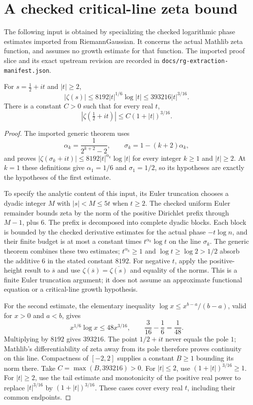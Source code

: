 \section{A checked critical-line zeta bound}

The following input is obtained by specializing the checked logarithmic
phase estimates imported from RiemannGaussian.  It concerns the actual
Mathlib zeta function, and assumes no growth estimate for that function.
The imported proof slice and its exact upstream revision are recorded in
\texttt{docs/rg-extraction-manifest.json}.

\begin{theorem}
\label{construction:weyl-zeta}
\leanok
For $s=\tfrac12+it$ and $|t|\geq2$,
\[
 |\zeta(s)|\leq8192|t|^{1/6}\log|t|
 \leq393216|t|^{3/16}.
\]
There is a constant $C>0$ such that for every real $t$,
\[
 |\zeta(\tfrac12+it)|\leq C(1+|t|)^{3/16}.
\]
\end{theorem}
\begin{proof}
The imported generic theorem uses
\[
 \alpha_k=\frac1{2^{k+2}-2},\qquad
 \sigma_k=1-(k+2)\alpha_k,
\]
and proves $|\zeta(\sigma_k+it)|\leq8192|t|^{\alpha_k}\log|t|$
for every integer $k\geq1$ and $|t|\geq2$.
At $k=1$ these definitions give $\alpha_1=1/6$ and $\sigma_1=1/2$,
so its hypotheses are exactly the hypotheses of the first estimate.

To specify the analytic content of this input, its Euler truncation
chooses a dyadic integer $M$ with $|s|<M\leq5t$ when $t\geq2$.
The checked uniform Euler remainder bounds zeta by the norm of the
positive Dirichlet prefix through $M-1$, plus $6$.
The prefix is decomposed into complete dyadic blocks.  Each block is
bounded by the checked derivative estimates for the actual phase
$-t\log n$, and their finite budget is at most a constant times
$t^{\alpha_k}\log t$ on the line $\sigma_k$.
The generic theorem combines these two estimates; $t^{\alpha_k}\geq1$
and $\log t\geq\log2>1/2$ absorb the additive $6$ in the stated
constant $8192$.  For negative $t$, apply the positive-height result to
$\overline{s}$ and use
$\zeta(\overline{s})=\overline{\zeta(s)}$ and equality of the norms.
This is a finite Euler truncation argument; it does not assume an
approximate functional equation or a critical-line growth hypothesis.

For the second estimate, the elementary inequality
$\log x\leq x^{b-a}/(b-a)$, valid for $x>0$ and $a<b$, gives
\[
 x^{1/6}\log x\leq48x^{3/16},
 \qquad \frac3{16}-\frac16=\frac1{48}.
\]
Multiplying by $8192$ gives $393216$.
The point $1/2+it$ never equals the pole $1$; Mathlib's differentiability
of zeta away from its pole therefore proves continuity on this line.
Compactness of $[-2,2]$ supplies a constant $B\geq1$ bounding its norm
there.  Take $C=\max(B,393216)>0$.
For $|t|\leq2$, use $(1+|t|)^{3/16}\geq1$.
For $|t|\geq2$, use the tail estimate and monotonicity of the positive
real power to replace $|t|^{3/16}$ by $(1+|t|)^{3/16}$.
These cases cover every real $t$, including their common endpoints.
\end{proof}
